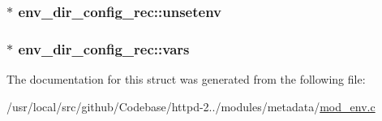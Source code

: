 \subsubsection[{\texorpdfstring{unsetenv}{unsetenv}}]{$\ast$ env\+\_\+dir\+\_\+config\+\_\+rec\+::unsetenv}\hypertarget{structenv__dir__config__rec_a5f68109ec6ae6e1cf457ab47aa25a3c1}{}\label{structenv__dir__config__rec_a5f68109ec6ae6e1cf457ab47aa25a3c1}
\subsubsection[{\texorpdfstring{vars}{vars}}]{$\ast$ env\+\_\+dir\+\_\+config\+\_\+rec\+::vars}\hypertarget{structenv__dir__config__rec_ad29cc4d037b30908a4fd2a68ecf31f83}{}\label{structenv__dir__config__rec_ad29cc4d037b30908a4fd2a68ecf31f83}


The documentation for this struct was generated from the following file\+:\begin{DoxyCompactItemize}
\item 
/usr/local/src/github/\+Codebase/httpd-\/2../modules/metadata/\hyperlink{mod__env_8c}{mod\+\_\+env.\+c}\end{DoxyCompactItemize}
